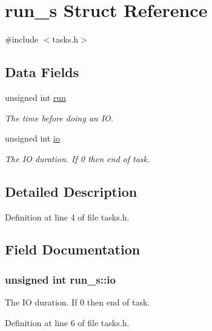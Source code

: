 \hypertarget{structrun__s}{\section{run\-\_\-s Struct Reference}
\label{structrun__s}
}


{\ttfamily \#include $<$tasks.\-h$>$}

\subsection*{Data Fields}
\begin{DoxyCompactItemize}
\item 
unsigned int \hyperlink{structrun__s_a1ebaf0153e1c18453f998d4e12781319}{run}
\begin{DoxyCompactList}\small\item\em The time before doing an I\-O. \end{DoxyCompactList}\item 
unsigned int \hyperlink{structrun__s_a9141a59a809de1cb89dd0c1797bbffc0}{io}
\begin{DoxyCompactList}\small\item\em The I\-O duration. If 0 then end of task. \end{DoxyCompactList}\end{DoxyCompactItemize}


\subsection{Detailed Description}


Definition at line 4 of file tasks.\-h.



\subsection{Field Documentation}
\hypertarget{structrun__s_a9141a59a809de1cb89dd0c1797bbffc0}{
\subsubsection[{io}]{\setlength{\rightskip}{0pt plus 5cm}unsigned int run\-\_\-s\-::io}}\label{structrun__s_a9141a59a809de1cb89dd0c1797bbffc0}


The I\-O duration. If 0 then end of task. 



Definition at line 6 of file tasks.\-h.



